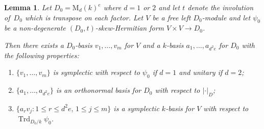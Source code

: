 \documentclass[11pt]{article}
\numberwithin{equation}{section}
\newenvironment{enumeratei}
{\bgroup\def\theenumi{\roman{enumi}}\def\theenumii{\alph{enumii}}\begin{enumerate}}
{\end{enumerate}\egroup}
\newcommand{\rM}{\mathrm{M}}
\DeclareMathOperator{\Trd}{Trd}
\newcommand{\abs}[1]{\lvert #1 \rvert}
\newtheorem{lemma}{Lemma}[section]
\begin{document}
\begin{lemma} \label{D0-basis}
Let $D_0 = \rM_d(k)^e$ where $d = 1$ or $2$ and let $t$ denote the involution of~$D_0$ which is transpose on each factor.
Let $V$ be a free left $D_0$-module and let $\psi_0$ be a non-degenerate $(D_0,t)$-skew-Hermitian form $V \times V \to D_0$.

Then there exists a $D_0$-basis $v_1, \dotsc, v_m$ for $V$ and a $k$-basis $a_1, \dotsc, a_{d^2e}$ for $D_0$ with the following properties:
\begin{enumeratei}
\item\label{D0-basisi} $\{ v_1, \dotsc, v_m \}$ is symplectic with respect to $\psi_0$ if $d=1$ and unitary if $d=2$;
\item\label{D0-basisii} $\{ a_1, \dotsc, a_{d^2e} \}$ is an orthonormal basis for $D_0$ with respect to $\abs{\cdot}_D$;
\item\label{D0-basisiii} $\{ a_r v_j : 1 \leq r \leq d^2e,\, 1 \leq j \leq m \}$ is a symplectic $k$-basis for $V$ with respect to $\Trd_{D_0/k} \psi_0$.
\end{enumeratei}
\end{lemma}
\end{document}
